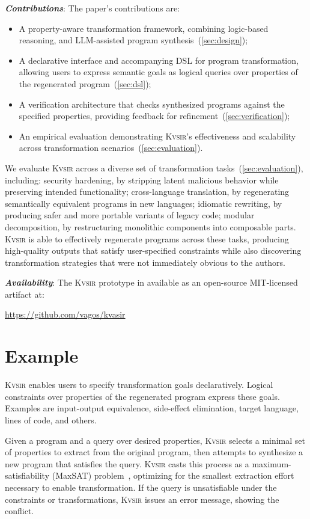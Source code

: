 \documentclass[noacm,sigplan]{acmart}
\newcommand{\sys}{{\scshape Kv{\textalpha}sir}\xspace}
\newcommand{\heading}[1]{\vspace{2pt}\noindent\textbf{\emph{#1}}:\enspace}
\begin{document}
\heading{Contributions}
The paper's contributions are:
\begin{itemize}
  \item A property-aware transformation framework, combining logic-based reasoning, and LLM-assisted program synthesis~(\cref{sec:design});
 \item A declarative interface and accompanying DSL for program transformation, allowing users to express semantic goals as logical queries over properties of the regenerated program~(\cref{sec:dsl});
 \item A verification architecture that checks synthesized programs against the specified properties, providing feedback for refinement~(\cref{sec:verification});
 \item An empirical evaluation demonstrating \sys's effectiveness and scalability across transformation scenarios~(\cref{sec:evaluation}).
\end{itemize}

We evaluate \sys across a diverse set of transformation tasks~(\cref{sec:evaluation}), including:
	security hardening, by stripping latent malicious behavior while preserving intended functionality;
	cross-language translation, by regenerating semantically equivalent programs in new languages;
	idiomatic rewriting, by producing safer and more portable variants of legacy code;
	modular decomposition, by restructuring monolithic components into composable parts.
\sys is able to effectively regenerate programs across these tasks, producing high-quality outputs that satisfy user-specified constraints while also discovering transformation strategies that were not immediately obvious to the authors.

\heading{Availability}
The \sys prototype in available as an open-source MIT-licensed artifact at:
\begin{center}
  \url{https://github.com/vagos/kvasir}
\end{center}

\section{Example}
\label{sec:example}
\sys enables users to specify transformation goals declaratively.
Logical constraints over properties of the
regenerated program express these goals. Examples are input-output equivalence, side-effect elimination,
target language, lines of code, and others.

Given a program and a query over desired properties, \sys selects a minimal set
of properties to extract from the original program, then attempts to synthesize
a new program that satisfies the query.
\sys casts this process as a
maximum-satisfiability (MaxSAT) problem~\cite{sung2006maximum}, optimizing for the smallest extraction
effort necessary to enable transformation.
If the query is unsatisfiable under
the constraints or transformations, \sys issues an error
message, showing the conflict.
\end{document}
